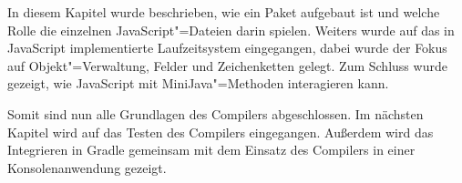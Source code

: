 \vspace{4em}
In diesem Kapitel wurde beschrieben, wie ein Paket aufgebaut ist und welche Rolle die einzelnen JavaScript"=Dateien darin spielen. Weiters wurde auf das in JavaScript implementierte Laufzeitsystem eingegangen, dabei wurde der Fokus auf Objekt"=Verwaltung, Felder und Zeichenketten gelegt. Zum Schluss wurde gezeigt, wie JavaScript mit MiniJava"=Methoden interagieren kann.

Somit sind nun alle Grundlagen des Compilers abgeschlossen. Im nächsten Kapitel wird auf das Testen des Compilers eingegangen. Außerdem wird das Integrieren in Gradle gemeinsam mit dem Einsatz des Compilers in einer Konsolenanwendung gezeigt.
